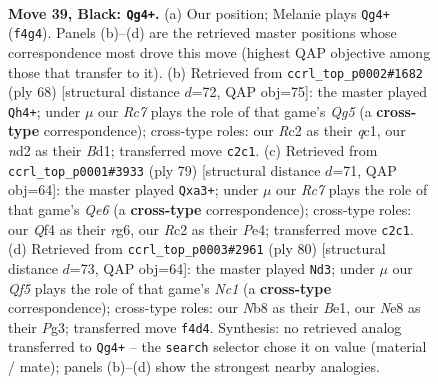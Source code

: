 \documentclass[11pt]{article}
\begin{document}
\clearpage

\begin{figure}[p]\centering
\begin{subfigure}{0.46\textwidth}\centering
\resizebox{\linewidth}{!}{%
\newchessgame
\chessboard[
  setfen={1n2nk2/7Q/7p/p4p1P/P4q2/8/2rN2K1/RN6 b - - 2 39},
  showmover=false,
  pgfstyle=straightmove, color=movearrow, markmove={f4-g4}
]}
\caption{}
\end{subfigure}\hfill
\begin{subfigure}{0.46\textwidth}\centering
\resizebox{\linewidth}{!}{%
\newchessgame
\chessboard[
  setfen={8/pb3p1k/4p3/4P1Q1/5n2/2N5/5PP1/2qBK3 w - - 13 35},
  showmover=false,
  pgfstyle=straightmove, color=movearrow, markmove={g5-h4}
]}
\caption{}
\end{subfigure}
\\[4pt]
\begin{subfigure}{0.46\textwidth}\centering
\resizebox{\linewidth}{!}{%
\newchessgame
\chessboard[
  setfen={1k1N4/1p6/p5RP/5p2/4p3/P3qN2/2P1n3/K3Q3 b - - 0 40},
  showmover=false,
  pgfstyle=straightmove, color=movearrow, markmove={e3-a3}
]}
\caption{}
\end{subfigure}\hfill
\begin{subfigure}{0.46\textwidth}\centering
\resizebox{\linewidth}{!}{%
\newchessgame
\chessboard[
  setfen={7k/1r2n3/r2nQ1pp/2p5/3p3P/6P1/7K/2N1B3 w - - 0 41},
  showmover=false,
  pgfstyle=straightmove, color=movearrow, markmove={c1-d3}
]}
\caption{}
\end{subfigure}
\caption{\textbf{Move 39, Black: \texttt{Qg4+}.} (a) Our position; Melanie plays \texttt{Qg4+} (\texttt{f4g4}). Panels (b)--(d) are the retrieved master positions whose correspondence most drove this move (highest QAP objective among those that transfer to it). (b) Retrieved from \texttt{ccrl\_top\_p0002\#1682} (ply 68) [structural distance $d$=72, QAP obj=75]: the master played \texttt{Qh4+}; under $\mu$ our \emph{Rc7} plays the role of that game's \emph{Qg5} (a \textbf{cross-type} correspondence); cross-type roles: our \emph{R}c2 as their \emph{q}c1, our \emph{n}d2 as their \emph{B}d1; transferred move \texttt{c2c1}. (c) Retrieved from \texttt{ccrl\_top\_p0001\#3933} (ply 79) [structural distance $d$=71, QAP obj=64]: the master played \texttt{Qxa3+}; under $\mu$ our \emph{Rc7} plays the role of that game's \emph{Qe6} (a \textbf{cross-type} correspondence); cross-type roles: our \emph{Q}f4 as their \emph{r}g6, our \emph{R}c2 as their \emph{P}e4; transferred move \texttt{c2c1}. (d) Retrieved from \texttt{ccrl\_top\_p0003\#2961} (ply 80) [structural distance $d$=73, QAP obj=64]: the master played \texttt{Nd3}; under $\mu$ our \emph{Qf5} plays the role of that game's \emph{Nc1} (a \textbf{cross-type} correspondence); cross-type roles: our \emph{N}b8 as their \emph{B}e1, our \emph{N}e8 as their \emph{P}g3; transferred move \texttt{f4d4}. Synthesis: no retrieved analog transferred to \texttt{Qg4+} -- the \texttt{search} selector chose it on value (material / mate); panels (b)--(d) show the strongest nearby analogies.}
\label{fig:thought-m77}
\end{figure}
\end{document}
